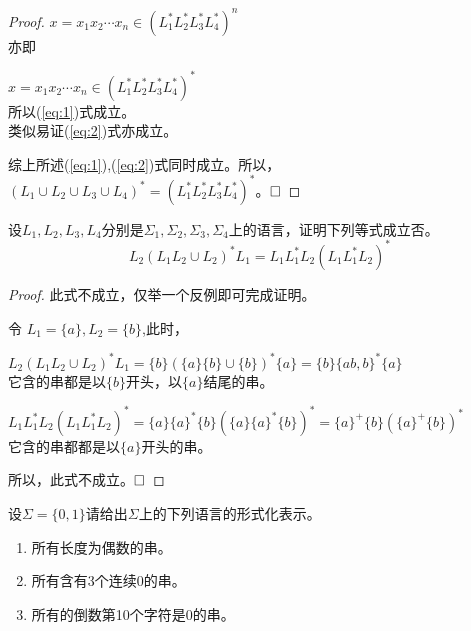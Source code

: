 \begin{solution}
\begin{proof}
		$x=x_1x_2\cdots x_n \in  (L_1^\ast L_2^\ast L_3^\ast L_4^\ast)^n$\\
		亦即
		
		$x=x_1x_2\cdots x_n \in  (L_1^\ast L_2^\ast L_3^\ast L_4^\ast)^\ast$\\
		所以(\ref{eq:1})式成立。\\
		类似易证(\ref{eq:2})式亦成立。
		
		综上所述(\ref{eq:1}),(\ref{eq:2})式同时成立。所以，$(L_1\cup L_2\cup L_3\cup L_4)^\ast=(L_1^\ast L_2^\ast L_3^\ast L_4^\ast)^\ast$。$\hfill\square$	
	\end{proof}
\end{solution}

\begin{exercise}
	设$L_1,L_2,L_3,L_4$分别是$\Sigma_1,\Sigma_2,\Sigma_3,\Sigma_4$上的语言，证明下列等式成立否。
	$$L_2(L_1L_2\cup L_2)^\ast L_1=L_1L_1^\ast L_2(L_1L_1^\ast L_2)^\ast$$
\end{exercise}

\begin{solution}
	\begin{proof}
		此式不成立，仅举一个反例即可完成证明。
		
		令 $L_1=\{a\},L_2=\{b\}$,此时，
		
		$L_2(L_1L_2\cup L_2)^\ast L_1=\{b\}(\{a\}\{b\}\cup\{b\})^\ast\{a\}=\{b\}\{ab,b\}^\ast\{a\}$\\
		它含的串都是以$\{b\}开头，以\{a\}结尾的串$。
		
		$L_1L_1^\ast L_2(L_1L_1^\ast L_2)^\ast=\{a\}\{a\}^\ast\{b\}(\{a\}\{a\}^\ast\{b\})^\ast=\{a\}^+\{b\}(\{a\}^+\{b\})^\ast$\\
		它含的串都都是以$\{a\}$开头的串。
		
		所以，此式不成立。$\hfill\square$
	\end{proof}
\end{solution}

\begin{exercise}
	设$\Sigma=\{0,1\}$请给出$\Sigma$上的下列语言的形式化表示。
	\begin{enumerate}
		\item 所有长度为偶数的串。
		\item 所有含有3个连续0的串。
		\item 所有的倒数第10个字符是0的串。
	\end{enumerate}
\end{exercise}

